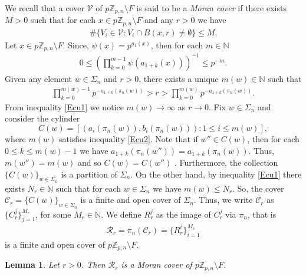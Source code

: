 \documentclass[11pt]{amsart}
\newtheorem{lemma}[theorem]{Lemma}
\theoremstyle{remark}
\numberwithin{equation}{section}
\newcommand{\N}{\mathbb{N}}
\newcommand{\Z}{\mathbb{Z}}
\begin{document}
 We recall that a cover $\mathcal{V}$ of $p\Z_{p,n}\setminus F$ is said to be a \textit{Moran cover} if there exists $M>0$ such that for each $x\in p\Z_{p,n}\setminus F$ and any $r>0$ we have 
\begin{align*}
    \#\{V_{i}\in \mathcal{V}: V_{i}\cap B(x,r)\neq \emptyset \}\leq M.
\end{align*} Let $x\in p\Z_{p,n}\setminus F$. Since, $\psi(x)=p^{a_{1}(x)}$, then for each $m\in \N$
\begin{align}\label{Ecu1}
    0\leq \left(\prod^{m-1}_{k=0}\psi(a_{1+k}(x)) \right)^{-1}\leq p^{-m}.
\end{align}Given any element $w\in \Sigma_{n}$ and $r>0$, there exists a unique $m(w)\in \N$ such that 
\begin{align}\label{Ecu2}
    \prod^{m(w)-1}_{k=0}p^{-a_{1+k}(\pi_{n}(w))}>r>\prod^{m(w)}_{k=0}p^{-a_{1+k}(\pi_{n}(w))}.
\end{align}From inequality \eqref{Ecu1} we notice $m(w)\to \infty$ as $r\to 0$. Fix $w\in \Sigma_{n}$ and consider the cylinder $$C(w)=[(a_{i}(\pi_{n}(w)),b_{i}(\pi_{n}(w))):1\leq i \leq m(w)],$$ where $m(w)$ satisfies inequality \eqref{Ecu2}. Note that if $w''\in C(w)$, then for each $0\leq k \leq m(w)-1$ we have $a_{1+k}(\pi_{n}(w''))=a_{1+k}(\pi_{n}(w))$. Thus, $m(w'')=m(w)$ and so $C(w)=C(w'')$ . Furthermore, the collection $\{C(w)\}_{w\in \Sigma_{n}}$ is a partition of $\Sigma_{n}$. On the other hand, by inequality \eqref{Ecu1} there exists $N_{r}\in \N$ such that for each $w\in \Sigma_{n}$ we have $m(w)\leq N_{r}$. So, the cover $\mathcal{C}_{r}=\{C(w)\}_{w\in \Sigma_{n}}$ is a finite and open cover of $\Sigma_{n}$. Thus, we write $\mathcal{C}_r$ as $\{C_r^{j}\}_{j=1}^{M_r}$, for some $M_r\in \N$. We define $R_r^{j}$ as the image of $C_r^{j}$ via $\pi_n$, that is 
\begin{align*}
    \mathcal{R}_{r}=\pi_{n}(\mathcal{C}_{r})=\{R_{r}^{i}\}_{i=1}^{M_{r}}
\end{align*}is a finite and open cover of $p\Z_{p,n}\setminus F$. 
\begin{lemma}\label{MoranCover}
    Let $r>0$. Then $\mathcal{R}_{r}$ is a Moran cover of $p\Z_{p,n}\setminus F$.
\end{lemma}
\end{document}
